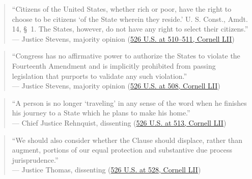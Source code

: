 \documentclass[12pt]{article}
\begin{document}
\begin{quote}
``Citizens of the United States, whether rich or poor, have the right to choose to be citizens `of the State wherein they reside.' U. S. Const., Amdt. 14, \S~1. The States, however, do not have any right to select their citizens.'' \\
--- Justice Stevens, majority opinion (\href{https://www.law.cornell.edu/supremecourt/text/98-97}{526 U.S. at 510--511, Cornell LII})
\end{quote}

\begin{quote}
``Congress has no affirmative power to authorize the States to violate the Fourteenth Amendment and is implicitly prohibited from passing legislation that purports to validate any such violation.'' \\
--- Justice Stevens, majority opinion (\href{https://www.law.cornell.edu/supremecourt/text/98-97}{526 U.S. at 508, Cornell LII})
\end{quote}

\begin{quote}
``A person is no longer `traveling' in any sense of the word when he finishes his journey to a State which he plans to make his home.'' \\
--- Chief Justice Rehnquist, dissenting (\href{https://www.law.cornell.edu/supct/html/98-97.ZD.html}{526 U.S. at 513, Cornell LII})
\end{quote}

\begin{quote}
``We should also consider whether the Clause should displace, rather than augment, portions of our equal protection and substantive due process jurisprudence.'' \\
--- Justice Thomas, dissenting (\href{https://www.law.cornell.edu/supct/html/98-97.ZD1.html}{526 U.S. at 528, Cornell LII})
\end{quote}
\end{document}
